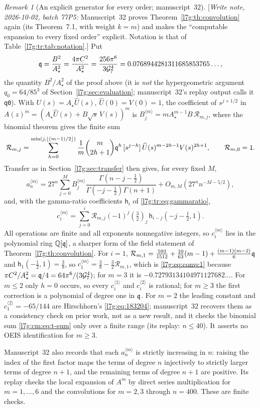 \documentclass[11pt,letterpaper]{article}
\theoremstyle{remark}\newtheorem{remark}[theorem]{Remark}
\newcommand{\G}{\mathcal G_7}\newcommand{\Ast}{A_\star}
\newcommand{\Q}{\mathbb Q}\newcommand{\tht}{\vartheta}
\newcommand{\writenote}[1]{\textup{[}\emph{Write note, 2026-10-02, batch 77P5:} #1\textup{]}}
\newcounter{l7gtrsavedeq}
\begin{document}
\begin{remark}[An explicit generator for every order; manuscript~32]\label{l7g:tr:rem:generator}
\writenote{Manuscript~32 proves Theorem~\ref{l7g:th:convolution} again
(its Theorem~7.1, with weight $k=m$) and makes the ``computable expansion
to every fixed order'' explicit. Notation is that of
Table~\ref{l7g:tr:tab:notation}.} Put
\[
 \qq=\frac{B^2}{\Ast^2}=\frac{4\pi C^2}{\Ast^2}=\frac{256\pi^6}{3\G^4}
 =0.0768944281311685853765\ldots,
\]
the quantity $B^2/\Ast^2$ of the proof above (it is \emph{not} the
hypergeometric argument $q_0=64/85^3$ of Section~\ref{l7g:sec:evaluation};
manuscript~32's replay output calls it \texttt{q0}). With
$U(s)=\Ast\widehat U(s)$, $\widehat U(0)=V(0)=1$, the coefficient of
$s^{j+1/2}$ in $A(z)^m=(\Ast\widehat U(s)+B\sqrt s\,V(s))^m$ is
$B_j^{\langle m\rangle}=m\Ast^{m-1}B\,\mathcal R_{m,j}$, where the binomial
theorem gives the finite sum
\[
 \mathcal R_{m,j}=\sum_{h=0}^{\min(j,\lfloor(m-1)/2\rfloor)}
 \frac1m\binom{m}{2h+1}\mathfrak q^{h}\,
 [s^{j-h}]\,\widehat U(s)^{m-2h-1}V(s)^{2h+1},
 \qquad \mathcal R_{m,0}=1.
\]
Transfer as in Section~\ref{l7g:sec:transfer} then gives, for every fixed
$M$,
\[
 a_n^{\langle m\rangle}=27^n\sum_{j=0}^{M}B_j^{\langle m\rangle}
 \frac{\Gamma(n-j-\frac12)}{\Gamma(-j-\frac12)\Gamma(n+1)}
 +O_{m,M}(27^nn^{-M-5/2}),
\]
and, with the gamma-ratio coefficients $\mathsf h_i$ of
\eqref{l7g:tr:eq:gammaratio},
\[
 c_i^{\langle m\rangle}=\sum_{j=0}^{i}\mathcal R_{m,j}(-1)^j(\tfrac32)_j\,
 \mathsf h_{i-j}(-j-\tfrac12,1).
\]
All operations are finite and all exponents nonnegative integers, so
$c_i^{\langle m\rangle}$ lies in the polynomial ring $\Q[\qq]$, a sharper
form of the field statement of Theorem~\ref{l7g:th:convolution}. For
$i=1$, $\mathcal R_{m,1}=\frac{593}{1512}+\frac{10}{63}(m-1)
+\frac{(m-1)(m-2)}6\mathfrak q$ and $\mathsf h_1(-\frac12,1)=\frac38$, so
$c_1^{\langle m\rangle}=\frac38-\frac32\mathcal R_{m,1}$, which is
\eqref{l7g:eq:convc1} because $\pi C^2/\Ast^2=\qq/4=64\pi^6/(3\G^4)$; for
$m=3$ it is $-0.72793134104971127682\ldots$. For $m\le2$ only $h=0$ occurs,
so every $c_i^{\langle 1\rangle}$ and $c_i^{\langle 2\rangle}$ is rational;
for $m\ge3$ the first correction is a polynomial of degree one in $\mathfrak q$.
For $m=2$ the leading constant and $c_1^{\langle2\rangle}=-65/144$ are
Hirschhorn's \eqref{l7g:eq:183204}; manuscript~32 recovers them as a
consistency check on prior work, not as a new result, and it checks the
binomial sum \eqref{l7g:cm:eq:t-sum} only over a finite range (its replay:
$n\le40$). It asserts no OEIS identification for $m\ge3$.

Manuscript~32 also records that each $a_n^{\langle m\rangle}$ is strictly
increasing in $n$: raising the index of the first factor maps the terms of
degree $n$ injectively to strictly larger terms of degree $n+1$, and the
remaining terms of degree $n+1$ are positive. Its replay checks the local
expansion of $A^m$ by direct series multiplication for $m=1,\dots,6$ and the
convolutions for $m=2,3$ through $n=400$. These are finite checks.
\end{remark}
\end{document}
